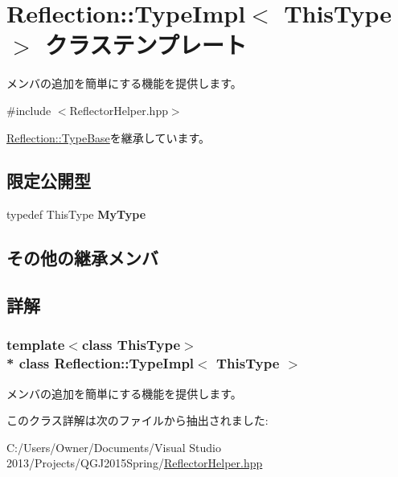 \hypertarget{class_reflection_1_1_type_impl}{}\section{Reflection\+:\+:Type\+Impl$<$ This\+Type $>$ クラステンプレート}
\label{class_reflection_1_1_type_impl}


メンバの追加を簡単にする機能を提供します。 




{\ttfamily \#include $<$Reflector\+Helper.\+hpp$>$}



\hyperlink{class_reflection_1_1_type_base}{Reflection\+::\+Type\+Base}を継承しています。

\subsection*{限定公開型}
\begin{DoxyCompactItemize}
\item 
typedef This\+Type {\bfseries My\+Type}\hypertarget{class_reflection_1_1_type_impl_aea3bbe3149775d844625a4c9f3380d5b}{}\label{class_reflection_1_1_type_impl_aea3bbe3149775d844625a4c9f3380d5b}

\end{DoxyCompactItemize}
\subsection*{その他の継承メンバ}


\subsection{詳解}
\subsubsection*{template$<$class This\+Type$>$\\*
class Reflection\+::\+Type\+Impl$<$ This\+Type $>$}

メンバの追加を簡単にする機能を提供します。



このクラス詳解は次のファイルから抽出されました\+:\begin{DoxyCompactItemize}
\item 
C\+:/\+Users/\+Owner/\+Documents/\+Visual Studio 2013/\+Projects/\+Q\+G\+J2015\+Spring/\hyperlink{_reflector_helper_8hpp}{Reflector\+Helper.\+hpp}\end{DoxyCompactItemize}
